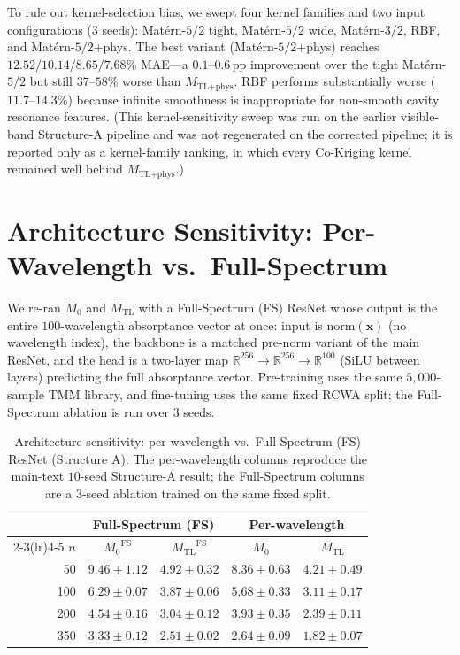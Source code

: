 \documentclass[11pt]{article}
\newcommand{\Mzero}{\ensuremath{M_0}}
\newcommand{\Mtl}{\ensuremath{M_\text{TL}}}
\newcommand{\Mtlphys}{\ensuremath{M_\text{TL+phys}}}
\begin{document}
To rule out kernel-selection bias, we swept four kernel families and two input configurations ($3$ seeds): Mat\'{e}rn-$5/2$ tight, Mat\'{e}rn-$5/2$ wide, Mat\'{e}rn-$3/2$, RBF, and Mat\'{e}rn-$5/2$+phys. The best variant (Mat\'{e}rn-$5/2$+phys) reaches $12.52/10.14/8.65/7.68\%$ MAE---a $0.1$--$0.6$\,pp improvement over the tight Mat\'{e}rn-$5/2$ but still $37$--$58\%$ worse than $\Mtlphys$. RBF performs substantially worse ($11.7$--$14.3\%$) because infinite smoothness is inappropriate for non-smooth cavity resonance features. (This kernel-sensitivity sweep was run on the earlier visible-band Structure-A pipeline and was not regenerated on the corrected pipeline; it is reported only as a kernel-family ranking, in which every Co-Kriging kernel remained well behind $\Mtlphys$.)


\section{Architecture Sensitivity: Per-Wavelength vs.\ Full-Spectrum}
\label{sec:si_fs}

We re-ran $\Mzero$ and $\Mtl$ with a Full-Spectrum (FS) ResNet whose output is the entire $100$-wavelength absorptance vector at once: input is $\text{norm}(\mathbf{x})$ (no wavelength index), the backbone is a matched pre-norm variant of the main ResNet, and the head is a two-layer map $\mathbb{R}^{256}\rightarrow\mathbb{R}^{256}\rightarrow\mathbb{R}^{100}$ (SiLU between layers) predicting the full absorptance vector. Pre-training uses the same $5{,}000$-sample TMM library, and fine-tuning uses the same fixed RCWA split; the Full-Spectrum ablation is run over $3$ seeds.

\begin{table}[htbp]\centering\small
\caption{Architecture sensitivity: per-wavelength vs.\ Full-Spectrum (FS) ResNet (Structure A). The per-wavelength columns reproduce the main-text $10$-seed Structure-A result; the Full-Spectrum columns are a $3$-seed ablation trained on the same fixed split.}
\label{tab:fs_arch}
\begin{tabular}{r cc cc}\toprule
& \multicolumn{2}{c}{\textbf{Full-Spectrum (FS)}} & \multicolumn{2}{c}{\textbf{Per-wavelength}}\\
\cmidrule(lr){2-3}\cmidrule(lr){4-5}
$n$ & $\Mzero^\text{FS}$ & $\Mtl^\text{FS}$ & $\Mzero$ & $\Mtl$\\\midrule
50  & $9.46 \pm 1.12$ & $4.92 \pm 0.32$ & $\mathbf{8.36 \pm 0.63}$ & $\mathbf{4.21 \pm 0.49}$\\
100 & $6.29 \pm 0.07$ & $3.87 \pm 0.06$ & $\mathbf{5.68 \pm 0.33}$ & $\mathbf{3.11 \pm 0.17}$\\
200 & $4.54 \pm 0.16$ & $3.04 \pm 0.12$ & $\mathbf{3.93 \pm 0.35}$ & $\mathbf{2.39 \pm 0.11}$\\
350 & $3.33 \pm 0.12$ & $2.51 \pm 0.02$ & $\mathbf{2.64 \pm 0.09}$ & $\mathbf{1.82 \pm 0.07}$\\\bottomrule
\end{tabular}
\end{table}
\end{document}
